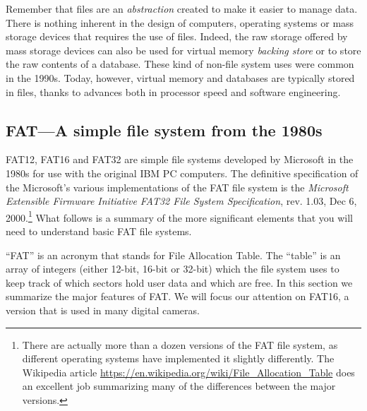 Remember that files are an \emph{abstraction} created to make it
easier to manage data. There is nothing inherent in the design of
computers, operating systems or mass storage devices that requires the
use of files. Indeed, the raw storage offered by mass storage devices
can also be used for virtual memory \emph{backing store} or to store the raw
contents of a database. These kind of non-file system uses were common
in the 1990s. Today, however, virtual memory and databases are
typically stored in files, thanks to advances both in processor speed
and software engineering. 


\subsection{FAT---A simple file system from the 1980s}
FAT12, FAT16 and FAT32 are simple file systems developed by Microsoft
in the 1980s for use with the original IBM PC computers. The
definitive specification of the Microsoft's various implementations of
the FAT file system is the \emph{Microsoft Extensible Firmware
  Initiative FAT32 File System Specification}, rev. 1.03, Dec 6,
2000\cite{microsoft-efi}.\footnote{There are actually more than a dozen
  versions of the FAT file system, as different operating systems have
  implemented it slightly differently. The Wikipedia article
  \url{https://en.wikipedia.org/wiki/File_Allocation_Table} does an
  excellent job summarizing many of the differences between the major
  versions.} What follows is a summary of the more
significant elements that you will need to understand basic FAT file systems.

``FAT'' is
an acronym that stands for File Allocation Table. The ``table'' is an
array of integers (either 12-bit, 16-bit or 32-bit) which the file
system uses to keep track of which sectors hold user data and which
are free. In this section we summarize the major features of FAT. We
will focus our attention on FAT16, a version that is used in many
digital cameras.

